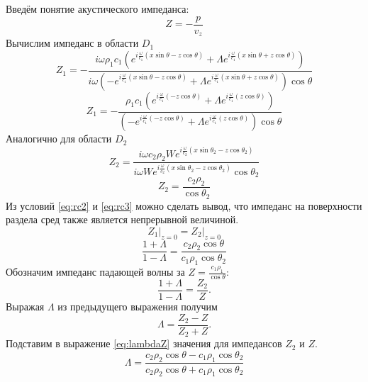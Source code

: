 \documentclass[a4paper, fontsize=14pt]{article}
\begin{document}
	Введём понятие акустического импеданса:
	\begin{equation}
		Z = -\frac{p}{v_z}
	\end{equation}
	Вычислим импеданс в области $D_1$
	\begin{equation}
		Z_1 = -\frac{i\omega \rho_1 c_1 (e^{i\frac{\omega}{c_1}(x\sin \theta - z\cos \theta)}+\Lambda e^{i\frac{\omega}{c_1}(x\sin \theta + z\cos \theta)})}{i\omega(-e^{i\frac{\omega}{c_1}(x\sin \theta - z\cos \theta)}+\Lambda e^{i\frac{\omega}{c_1}(x\sin \theta + z\cos \theta)}) \cos \theta }
	\end{equation}
	\begin{equation}
		Z_1 = -\frac{ \rho_1 c_1 (e^{i\frac{\omega}{c_1}(- z\cos \theta)}+\Lambda e^{i\frac{\omega}{c_1}( z\cos \theta)})}{(-e^{i\frac{\omega}{c_1}( - z\cos \theta)}+\Lambda e^{i\frac{\omega}{c_1}(z\cos \theta)}) \cos \theta }
		\label{eq:impz1}
	\end{equation} 
	Аналогично для области $D_2$
	\begin{equation}
		Z_2 = \frac{i\omega c_2 \rho_2 W e^{i\frac{\omega}{c_2}(x\sin \theta_2 - z\cos \theta_2)}}{i\omega W e^{i\frac{\omega}{c_2}(x\sin \theta_2 - z\cos \theta_2)}\cos \theta_2}
	\end{equation}
	\begin{equation}
		Z_2 = \frac{ c_2 \rho_2 }{ \cos \theta_2}
	\end{equation}
	Из условий \eqref{eq:rc2} и \eqref{eq:rc3} можно сделать вывод, что импеданс на поверхности раздела сред также является непрерывной величиной.
	\begin{equation}
		\left.Z_1\right|_{z=0} = \left. Z_2 \right|_{z=0}
	\end{equation}
	\begin{equation}
		\frac{1+\Lambda }{1-\Lambda } = \frac{c_2 \rho_2 \cos \theta }{c_1 \rho_1 \cos \theta_2 }
	\end{equation}
	Обозначим импеданс падающей волны за $Z = \frac{c_1\rho_1}{\cos \theta}$:
	\begin{equation}
		\frac{1+\Lambda }{1-\Lambda } = \frac{Z_2 }{Z}.
	\end{equation}
	Выражая $\Lambda $ из предыдущего выражения получим
	\begin{equation}
		\Lambda =\frac{Z_2-Z}{Z_2+Z}.
		\label{eq:lambdaZ}
	\end{equation}
	Подставим в выражение \eqref{eq:lambdaZ} значения для импедансов $Z_2$ и $Z$.
	\begin{equation}
		\Lambda = \frac{c_2 \rho_2 \cos \theta - c_1 \rho_1 \cos \theta_2}{c_2 \rho_2 \cos \theta + c_1 \rho_1 \cos \theta_2} 
		\label{eq:lambda}
	\end{equation}
\end{document}
